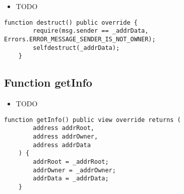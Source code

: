 \begin{itemize}
\item TODO
\end{itemize}

\begin{lstlisting}[firstnumber=41]
    function destruct() public override {
        require(msg.sender == _addrData, Errors.ERROR_MESSAGE_SENDER_IS_NOT_OWNER);
        selfdestruct(_addrData);
    }
\end{lstlisting}

\subsection{Function getInfo}

\begin{itemize}
\item TODO
\end{itemize}

\begin{lstlisting}[firstnumber=31]
    function getInfo() public view override returns (
        address addrRoot,
        address addrOwner,
        address addrData
    ) {
        addrRoot = _addrRoot;
        addrOwner = _addrOwner;
        addrData = _addrData;
    }
\end{lstlisting}
